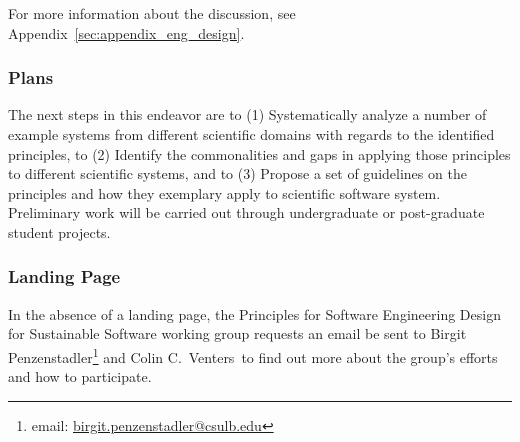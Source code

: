 For more information about the discussion, see Appendix~\ref{sec:appendix_eng_design}.

\subsubsection{Plans}
The next steps in this endeavor are to (1) Systematically analyze a number of example systems from different scientific domains with regards to the identified principles, to (2) Identify the commonalities and gaps in applying those principles to different scientific systems, and to (3) Propose a set of guidelines on the principles and how they exemplary apply to scientific software system. Preliminary work will be carried out through undergraduate or post-graduate student projects.

\subsubsection{Landing Page}
In the absence of a landing page, the Principles for Software Engineering Design for Sustainable Software working group requests an email be sent to Birgit Penzenstadler\footnote{email: \href{mailto:birgit.penzenstadler@csulb.edu}{birgit.penzenstadler@csulb.edu}} and Colin C.\ Venters\ to find out more about the group's efforts and how to participate.

